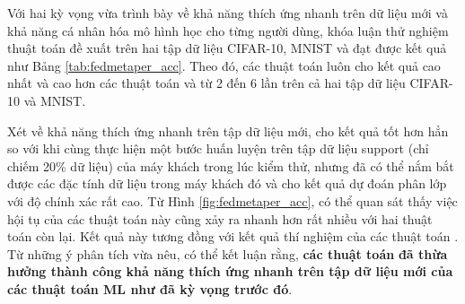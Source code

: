 Với hai kỳ vọng vừa trình bày về khả năng thích ứng nhanh trên dữ liệu mới và khả năng cá nhân hóa mô hình học cho từng người dùng, khóa luận thử nghiệm thuật toán đề xuất trên hai tập dữ liệu CIFAR-10, MNIST và đạt được kết quả như Bảng \ref{tab:fedmetaper_acc}. Theo đó, các thuật toán  luôn cho kết quả cao nhất và cao hơn các thuật toán  và  từ 2 đến 6 lần trên cả hai tập dữ liệu CIFAR-10 và MNIST.

\begin{table}[H]
    \centering
    \caption{Bảng độ chính xác (\%) của thuật toán FedPer và các thuật toán FedMeta-Per tính trên điểm dữ liệu (dữ liệu Non-IID)}
    \label{tab:fedmetaper_acc}
\end{table}

Xét về khả năng thích ứng nhanh trên tập dữ liệu mới,  cho kết quả tốt hơn hẳn so với  khi cùng thực hiện một bước huấn luyện trên tập dữ liệu support (chỉ chiếm 20\% dữ liệu) của máy khách trong lúc kiểm thử, nhưng đã có thể nắm bắt được các đặc tính dữ liệu trong máy khách đó và cho kết quả dự đoán phân lớp với độ chính xác rất cao. Từ Hình \ref{fig:fedmetaper_acc}, có thể quan sát thấy việc hội tụ của các thuật toán này cũng xảy ra nhanh hơn rất nhiều với hai thuật toán còn lại. Kết quả này tương đồng với kết quả thí nghiệm của các thuật toán . Từ những ý phân tích vừa nêu, có thể kết luận rằng, \textbf{các thuật toán}  \textbf{đã thừa hưởng thành công khả năng thích ứng nhanh trên tập dữ liệu mới của các thuật toán ML như đã kỳ vọng trước đó}.


